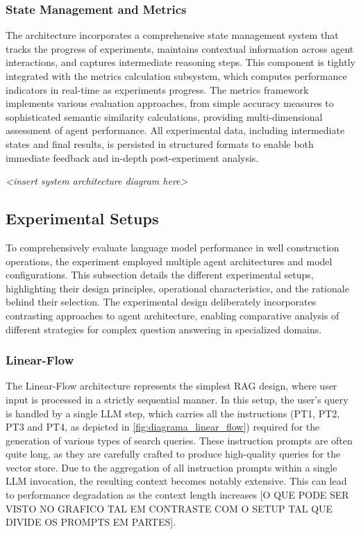             \subsubsection{State Management and Metrics}

                The architecture incorporates a comprehensive state management system that tracks the progress of experiments, maintains contextual information across agent interactions, and captures intermediate reasoning steps. This component is tightly integrated with the metrics calculation subsystem, which computes performance indicators in real-time as experiments progress. The metrics framework implements various evaluation approaches, from simple accuracy measures to sophisticated semantic similarity calculations, providing multi-dimensional assessment of agent performance. All experimental data, including intermediate states and final results, is persisted in structured formats to enable both immediate feedback and in-depth post-experiment analysis.

                \textit{<insert system architecture diagram here>}

        \subsection{Experimental Setups}

            To comprehensively evaluate language model performance in well construction operations, the experiment employed multiple agent architectures and model configurations. This subsection details the different experimental setups, highlighting their design principles, operational characteristics, and the rationale behind their selection. The experimental design deliberately incorporates contrasting approaches to agent architecture, enabling comparative analysis of different strategies for complex question answering in specialized domains.
            

            \subsubsection{Linear-Flow}

                The Linear-Flow architecture represents the simplest RAG design, where user input is processed in a strictly sequential manner. In this setup, the user’s query is handled by a single LLM step, which carries all the instructions (PT1, PT2, PT3 and PT4, as depicted in \ref{fig:diagrama_linear_flow}) required for the generation of various types of search queries. These instruction prompts are often quite long, as they are carefully crafted to produce high-quality queries for the vector store. Due to the aggregation of all instruction prompts within a single LLM invocation, the resulting context becomes notably extensive. This can lead to performance degradation as the context length increases [O QUE PODE SER VISTO NO GRAFICO TAL EM CONTRASTE COM O SETUP TAL QUE DIVIDE OS PROMPTS EM PARTES]. 
            

